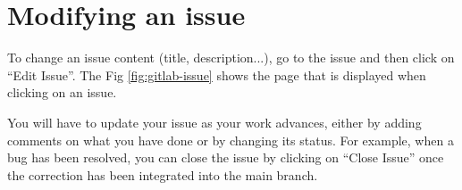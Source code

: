 \section{Modifying an issue}
%
%
To change an issue content (title, description...), go to the issue and then
click on ``Edit Issue''. The Fig \ref{fig:gitlab-issue} shows the page that is
displayed when clicking on an issue.

You will have to update your issue as your work advances, either by adding
comments on what you have done or by changing its status. For example, when a
bug has been resolved, you can close the issue by clicking on ``Close Issue''
once the correction has been integrated into the main branch.
%
